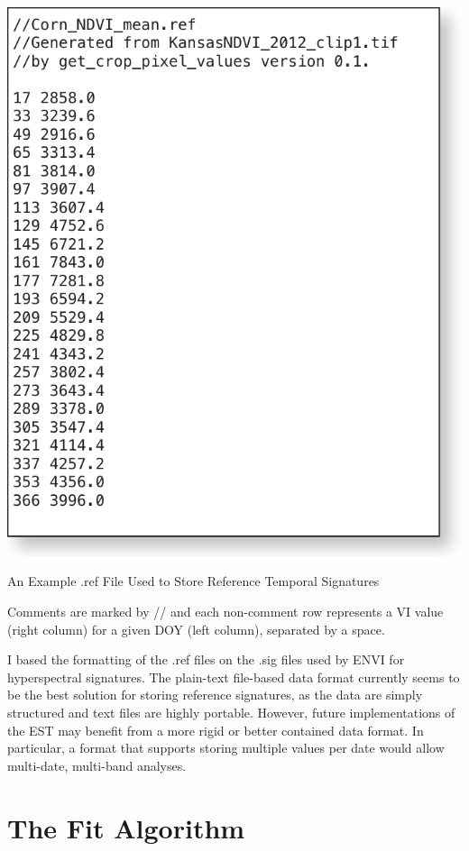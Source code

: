 \begin{ssfigure}
  \centering
  \includegraphics[scale=0.75]{Graphics/reffile.pdf}
  \caption{An Example .ref File Used to Store Reference Temporal Signatures}
  \medskip
  \small
  Comments are marked by // and each non-comment row represents a VI value (right column) for a given DOY (left column), separated by a space.
  \label{fig:reffile}
\end{ssfigure}

I based the formatting of the .ref files on the .sig files used by ENVI for hyperspectral signatures. The plain-text file-based data format currently seems to be the best solution for storing reference signatures, as the data are simply structured and text files are highly portable. However, future implementations of the EST may benefit from a more rigid or better contained data format. In particular, a format that supports storing multiple values per date would allow multi-date, multi-band analyses.


\section{The Fit Algorithm}
\label{appendix:tools:fit}


